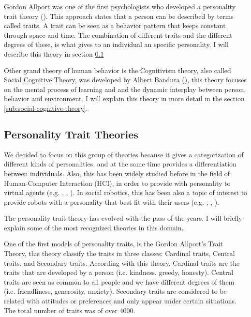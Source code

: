 Gordon Allport was one of the first psychologists who developed a personality trait theory (\cite{allport1937personality}). This approach states that a person can be described by terms called traits. A trait can be seen as a behavior pattern that keeps constant through space and time. The combination of different traits and the different degrees of these, is what gives to an individual an specific personality. I will describe this theory in section \ref{sub:personality-trait-theory}

Other grand theory of human behavior is the Cognitivism theory, also called Social Cognitive Theory, was developed by Albert Bandura (\cite{bandura1989human}), this theory focuses on the mental process of learning and and the dynamic interplay between person, behavior and environment. I will explain this theory in more detail in the section \ref{sub:social-cognitive-theory}.


\subsection{Personality Trait Theories}
\label{sub:personality-trait-theory}

We decided to focus on this group of theories because it gives a categorization of different kinds of personalities, and at the same time provides a differentiation between individuals. Also, this has been widely studied before in the field of Human-Computer Interaction (HCI), in order to provide with personality to virtual agents (e.g. \cite{andre2000exploiting}, \cite{allbeck2002toward}, \cite{egges2004generic}). In social robotics, this has been also a topic of interest to provide robots with a personality that best fit with their users (e.g. \cite{woods2005robot}, \cite{tapus2008user}, \cite{hendriks2011robot}).

The personality trait theory has evolved with the pass of the years. I will briefly explain some of the most recognized theories in this domain.

One of the first models of personality traits, is the Gordon Allport’s Trait Theory, this theory classify the traits in three classes: Cardinal traits, Central traits, and Secondary traits. According with this theory, Cardinal traits are the traits that are developed by a person (i.e. kindness, greedy, honesty).  Central traits are seen as common to all people and we have different degrees of them (i.e. friendliness, generosity, anxiety). Secondary traits are considered to be related with attitudes or preferences and only appear under certain situations. The total number of traits was of over 4000.

